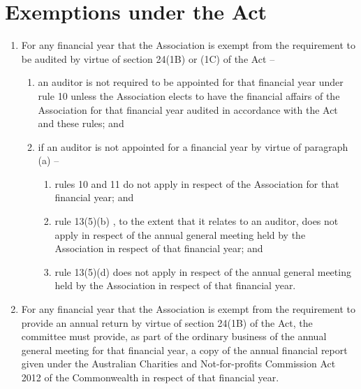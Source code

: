\documentclass[a4paper,11pt]{article}
\begin{document}
\section{Exemptions under the Act}
\begin{enumerate}
	\item For any financial year that the Association is exempt from the requirement to be audited by virtue of section 24(1B) or (1C) of the Act --
	\begin{enumerate}
		\item an auditor is not required to be appointed for that financial year under rule 10 unless the Association elects to have the financial affairs of the Association for that financial year audited in accordance with the Act and these rules; and
		
		\item if an auditor is not appointed for a financial year by virtue of paragraph (a) --
		\begin{enumerate}
			\item rules 10 and 11 do not apply in respect of the Association for that financial year; and
			\item rule 13(5)(b) , to the extent that it relates to an auditor, does not apply in respect of the annual general meeting held by the Association in respect of that financial year; and
			\item rule 13(5)(d) does not apply in respect of the annual general meeting held by the Association in respect of that financial year.
		\end{enumerate}
	\end{enumerate}
	
	\item For any financial year that the Association is exempt from the requirement to provide an annual return by virtue of section 24(1B) of the Act, the committee must provide, as part of the ordinary business of the annual general meeting for that financial year, a copy of the annual financial report given under the Australian Charities and Not-for-profits Commission Act 2012 of the Commonwealth in respect of that financial year.
\end{enumerate}
\end{document}
